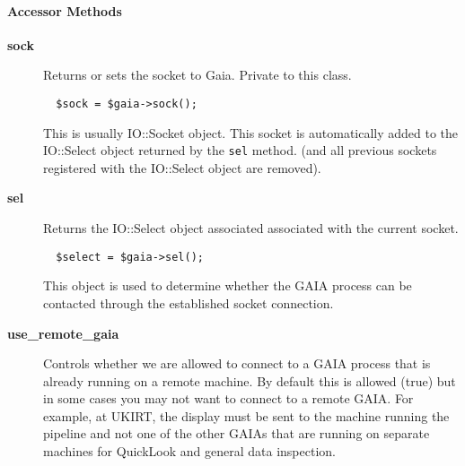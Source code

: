 \paragraph*{Accessor Methods\label{ORAC::Display::GAIA_Accessor_Methods}}\begin{description}
\item[\textbf{sock}] \mbox{}

Returns or sets the socket to Gaia. Private to this class.

\begin{verbatim}
  $sock = $gaia->sock();
\end{verbatim}


This is usually IO::Socket object. This socket is automatically
added to the IO::Select object returned by the \texttt{sel} method.
(and all previous sockets registered with the IO::Select object
are removed).

\item[\textbf{sel}] \mbox{}

Returns the IO::Select object associated associated with the
current socket.

\begin{verbatim}
  $select = $gaia->sel();
\end{verbatim}


This object is used to determine whether the GAIA process can be
contacted through the established socket connection.

\item[\textbf{use\_remote\_gaia}] \mbox{}

Controls whether we are allowed to connect to a GAIA process that
is already running on a remote machine. By default this is allowed
(true) but in some cases you may not want to connect to a remote
GAIA. For example, at UKIRT, the display must be sent to the machine
running the pipeline and not one of the other GAIAs that are running
on separate machines for QuickLook and general data inspection.

\end{description}
